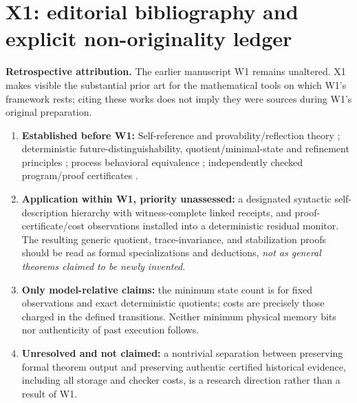 \documentclass[11pt,letterpaper]{article}
\begin{document}
\section{X1: editorial bibliography and explicit non-originality ledger}
\label{app:attributionX1}
\noindent\textbf{Retrospective attribution.} The earlier manuscript W1 remains unaltered. X1 makes visible the substantial prior art for the mathematical tools on which W1's framework rests; citing these works does not imply they were sources during W1's original preparation.
\begin{enumerate}[leftmargin=*,itemsep=.25em]
\item \textbf{Established before W1:} Self-reference and provability/reflection theory \cite{godel,lob,feferman}; deterministic future-distinguishability, quotient/minimal-state and refinement principles \cite{nerode}; process behavioral equivalence \cite{milner}; independently checked program/proof certificates \cite{necula,besson}.
\item \textbf{Application within W1, priority unassessed:} a designated syntactic self-description hierarchy with witness-complete linked receipts, and proof-certificate/cost observations installed into a deterministic residual monitor. The resulting generic quotient, trace-invariance, and stabilization proofs should be read as formal specializations and deductions, \emph{not as general theorems claimed to be newly invented}.
\item \textbf{Only model-relative claims:} the minimum state count is for fixed observations and exact deterministic quotients; costs are precisely those charged in the defined transitions. Neither minimum physical memory bits nor authenticity of past execution follows.
\item \textbf{Unresolved and not claimed:} a nontrivial separation between preserving formal theorem output and preserving authentic certified historical evidence, including all storage and checker costs, is a research direction rather than a result of W1.
\end{enumerate}
\end{document}
